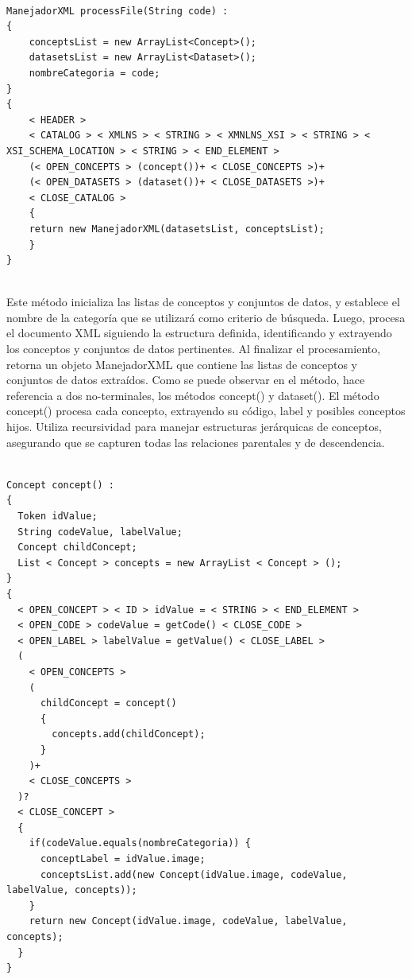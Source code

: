 \lstset{inputencoding=utf8/latin1}
\begin{lstlisting}

ManejadorXML processFile(String code) :
{
    conceptsList = new ArrayList<Concept>();
    datasetsList = new ArrayList<Dataset>();
    nombreCategoria = code;
}
{
    < HEADER > 
    < CATALOG > < XMLNS > < STRING > < XMNLNS_XSI > < STRING > < XSI_SCHEMA_LOCATION > < STRING > < END_ELEMENT >
    (< OPEN_CONCEPTS > (concept())+ < CLOSE_CONCEPTS >)+
    (< OPEN_DATASETS > (dataset())+ < CLOSE_DATASETS >)+
    < CLOSE_CATALOG >
    {
    return new ManejadorXML(datasetsList, conceptsList);
    }
}
    
\end{lstlisting}

Este método inicializa las listas de conceptos y conjuntos de datos, y establece el nombre de la categoría que se utilizará como criterio de búsqueda. Luego, procesa el documento XML siguiendo la estructura definida, identificando y extrayendo los conceptos y conjuntos de datos pertinentes. Al finalizar el procesamiento, retorna un objeto ManejadorXML que contiene las listas de conceptos y conjuntos de datos extraídos.
Como se puede observar en el método, hace referencia a dos no-terminales, los métodos concept() y dataset().
El método concept() procesa cada concepto, extrayendo su código, label y posibles conceptos hijos. Utiliza recursividad para manejar estructuras jerárquicas de conceptos, asegurando que se capturen todas las relaciones parentales y de descendencia.

\lstset{inputencoding=utf8/latin1}
\begin{lstlisting}
    
Concept concept() :
{
  Token idValue;
  String codeValue, labelValue;
  Concept childConcept; 
  List < Concept > concepts = new ArrayList < Concept > ();
}
{
  < OPEN_CONCEPT > < ID > idValue = < STRING > < END_ELEMENT > 
  < OPEN_CODE > codeValue = getCode() < CLOSE_CODE > 
  < OPEN_LABEL > labelValue = getValue() < CLOSE_LABEL >
  (
    < OPEN_CONCEPTS >
    (
      childConcept = concept()
      {
        concepts.add(childConcept);
      }
    )+
    < CLOSE_CONCEPTS >
  )?
  < CLOSE_CONCEPT >
  {
    if(codeValue.equals(nombreCategoria)) {
      conceptLabel = idValue.image;
      conceptsList.add(new Concept(idValue.image, codeValue, labelValue, concepts));
	}
	return new Concept(idValue.image, codeValue, labelValue, concepts);
  }
}

\end{lstlisting}

